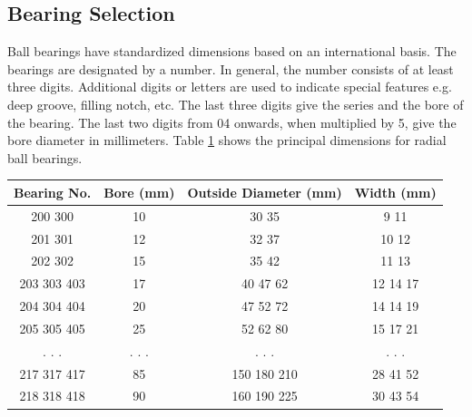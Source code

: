 {\sectionbreak}
\subsection{Bearing Selection}
Ball bearings have standardized dimensions based on an international basis. The bearings are designated by a number. In general, the number consists of at least three digits. Additional digits or letters are used to indicate special features e.g. deep groove, filling notch, etc. The last three digits give the series and the bore of the bearing. The last two digits from 04 onwards, when multiplied by 5, give the bore diameter in millimeters.
Table \ref{table:bearingtable} shows the principal dimensions for radial ball bearings\cite{khurmi_textbook_2005}.

\begin{table}[h]
  \begin{center}
    \leavevmode
    \begin{tabular}{|c|c|c|c|}\hline
    Bearing No. & Bore (mm) & Outside Diameter (mm) & Width (mm) \\\hline
    200
    300 & 10 & 30
    35 & 9
    11 \\\hline
    201
    301 & 12 & 32
    37 & 10
    12 \\\hline
    202
    302 & 15 & 35
    42 & 11
    13 \\\hline
    203
    303
    403 & 17 & 40
    47
    62 & 12
    14
    17 \\\hline
    204
    304
    404 & 20 & 47
    52
    72 & 14
    14
    19 \\\hline
    205
    305
    405 & 25 & 52
    62
    80 & 15
    17
    21 \\\hline
    .
    .
    . & .
    .
    . & .
    .
    . & .
    .
    . \\\hline
    217
    317
    417 & 85 & 150
    180
    210 & 28
    41
    52 \\\hline
    218
    318
    418 & 90 & 160
    190
    225 & 30
    43
    54 \\\hline
    \end{tabular}
    \label{table:bearingtable}
  \end{center}
\end{table}


